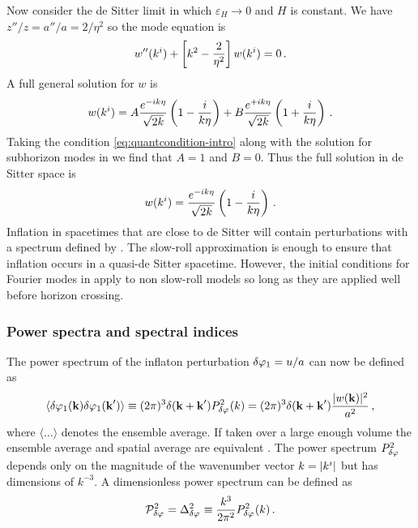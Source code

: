 Now consider the de Sitter limit in which $\varepsilon_H\rightarrow 0$ and $H$
is constant. We have $z''/z = a''/a = 2/\eta^2$ so the mode equation is
% 
\begin{equation}
  w''(k^i) + \left[ k^2 -\frac{2}{\eta^2} \right]w(k^i) = 0\,.
\end{equation}
% 
A full general solution for $w$ is
% 
\begin{equation}
 w(k^i) = A\frac{e^{-ik\eta}}{\sqrt{2k}}\left(1 -\frac{i}{k\eta}\right)
	  +B\frac{e^{+ik\eta}}{\sqrt{2k}}\left(1 +\frac{i}{k\eta}\right)\,.
\end{equation}
% 
Taking the condition \eqref{eq:quantcondition-intro} along with the solution
for subhorizon modes in  we find that $A=1$ and $B=0$.
Thus the full solution in de Sitter space is \cite{book:liddle}
% 
\begin{equation}
\label{eq:wfinal-intro}
 w(k^i) = \frac{e^{-ik\eta}}{\sqrt{2k}}\left(1 -\frac{i}{k\eta}\right)\,.
\end{equation}
% 
Inflation in spacetimes that are close to de Sitter will contain perturbations
with a spectrum defined by . The slow-roll approximation is
enough to ensure that inflation occurs in a quasi-de Sitter spacetime.
However, the initial conditions for Fourier modes in 
apply to non slow-roll models so long as they are applied well before horizon
crossing.


\subsubsection{Power spectra and spectral indices}
The power spectrum of the inflaton perturbation $\delta\varphi_{1} = u/a$ can now be
defined as
% 
\begin{equation}
  \langle \delta\varphi_{1}(\textbf{k}) \delta\varphi_{1}(\textbf{k}') \rangle 
   \equiv (2\pi)^3 \delta(\textbf{k} + \textbf{k}') P_{\delta\varphi_{}}^2 (k)
   = (2\pi)^3 \delta(\textbf{k} + \textbf{k}') \frac{|w(\textbf{k})|^2}{a^2}\,,
\end{equation}
% 
where $\langle \ldots \rangle$ denotes the ensemble average. 
If taken over a large enough volume the ensemble average and spatial average
are equivalent \cite{book:lyth}.
The power spectrum
$P_{\delta\varphi_{}}^2$ depends only on the magnitude of the wavenumber
vector $k=|k^i|$ but has dimensions of $k^{-3}$. A dimensionless power spectrum
can be defined as
% 
\begin{equation}
 \label{eq:curlPrdefn-intro}
 \mathcal{P}_{\delta\varphi_{}}^2= \Delta^2_{\delta\varphi_{}} \equiv \frac{k^3}{2\pi^2}
P_{\delta\varphi_{}}^2(k)\,.
\end{equation}
% 

